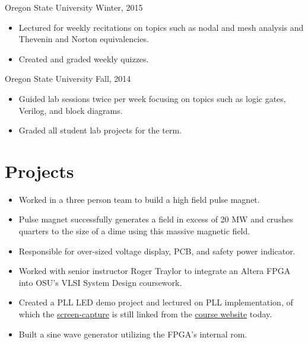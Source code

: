\documentclass[]{friggeri-cv}
\begin{document}
         {Oregon State University}
         {Winter, 2015}
         \begin{itemize}
           \item Lectured for weekly recitations on topics such as nodal and mesh 
                 analysis and Thevenin and Norton equivalencies.
           \item Created and graded weekly quizzes.
         \end{itemize}

         {Oregon State University}
         {Fall, 2014}
         \begin{itemize}
           \item Guided lab sessions twice per week focusing on topics such as logic
                 gates, Verilog, and block diagrams.
           \item Graded all student lab projects for the term.
         \end{itemize}



\section{Projects}  

         \begin{itemize}
           \item Worked in a three person team to build a high field pulse magnet.
           \item Pulse magnet successfully generates a field in excess of 20 MW and 
                 crushes quarters to the size of a dime using this massive magnetic field.
           \item Responsible for over-sized voltage display, PCB, and safety power indicator.
         \end{itemize} 
    

         \begin{itemize}
           \item Worked with senior instructor Roger Traylor to integrate an Altera FPGA 
                 into OSU's VLSI System Design coursework.
           \item Created a PLL LED demo project and lectured on PLL implementation, of which 
                 the 
                 \href{https://drive.google.com/file/d/0B_A8ZVw8vDrfZHMtQ0pHdFRmeWM/view}{screen-capture} 
                 is still linked from the 
                 \href{http://classes.engr.oregonstate.edu/eecs/spring2016/ece474/}{course website} 
                today.
           \item Built a sine wave generator utilizing the FPGA's internal rom.
         \end{itemize}
\end{document}
